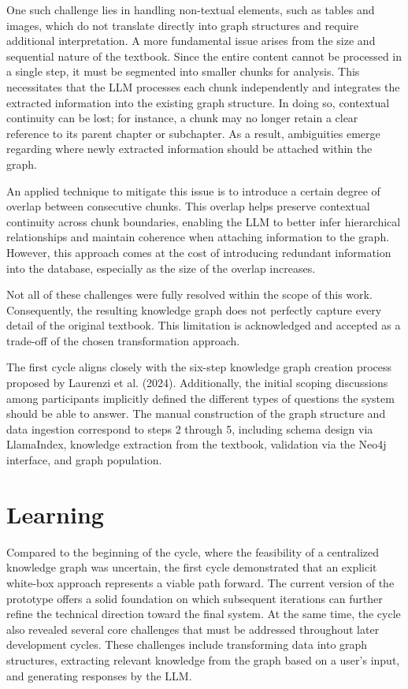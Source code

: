 One such challenge lies in handling non-textual elements, such as tables and images, which do not translate directly into graph structures and require additional interpretation. A more fundamental issue arises from the size and sequential nature of the textbook. Since the entire content cannot be processed in a single step, it must be segmented into smaller chunks for analysis. This necessitates that the LLM processes each chunk independently and integrates the extracted information into the existing graph structure. In doing so, contextual continuity can be lost; for instance, a chunk may no longer retain a clear reference to its parent chapter or subchapter. As a result, ambiguities emerge regarding where newly extracted information should be attached within the graph.

An applied technique to mitigate this issue is to introduce a certain degree of overlap between consecutive chunks. This overlap helps preserve contextual continuity across chunk boundaries, enabling the LLM to better infer hierarchical relationships and maintain coherence when attaching information to the graph. However, this approach comes at the cost of introducing redundant information into the database, especially as the size of the overlap increases.

Not all of these challenges were fully resolved within the scope of this work. Consequently, the resulting knowledge graph does not perfectly capture every detail of the original textbook. This limitation is acknowledged and accepted as a trade-off of the chosen transformation approach.

The first cycle aligns closely with the six-step knowledge graph creation process proposed by Laurenzi et al. (2024). \cite{laurenzi2024llm} Additionally, the initial scoping discussions among participants implicitly defined the different types of questions the system should be able to answer. The manual construction of the graph structure and data ingestion correspond to steps 2 through 5, including schema design via LlamaIndex, knowledge extraction from the textbook, validation via the Neo4j interface, and graph population.

\section{Learning}
\label{sec:cycle1_learning}
Compared to the beginning of the cycle, where the feasibility of a centralized knowledge graph was uncertain, the first cycle demonstrated that an explicit white-box approach represents a viable path forward. The current version of the prototype offers a solid foundation on which subsequent iterations can further refine the technical direction toward the final system. At the same time, the cycle also revealed several core challenges that must be addressed throughout later development cycles. These challenges include transforming data into graph structures, extracting relevant knowledge from the graph based on a user's input, and generating responses by the LLM.

